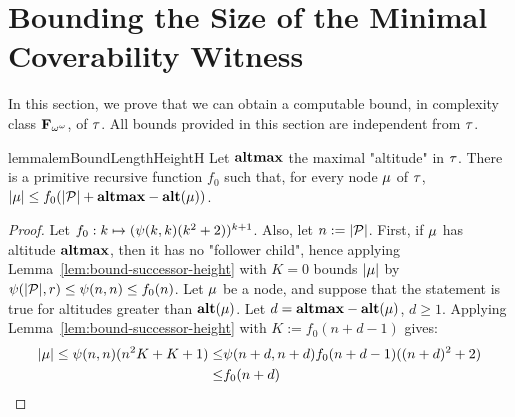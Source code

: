 \section{Bounding the Size of the Minimal Coverability Witness}
\label{app:proofs_bounds}

In this section, we prove that we can obtain a computable bound, in complexity class $\mathbf{F}_{\omega^{\omega}}$, of $\tau$. All bounds provided in this section are independent from $\tau$. 

\begin{restatable}{lemma}{lemBoundLengthHeightH}
	\label{lem:bound-length-at-height-h}
	Let $\mathbf{altmax}$ the maximal "altitude" in $\tau$. There is a primitive recursive function $f_0$ such that, for every node $\mu$ of $\tau$, $|\mu| \leq f_0(|\mathcal{P}| + \mathbf{altmax} - \mathbf{alt}(\mu))$.
\end{restatable}
\begin{proof}
Let $f_0: k \mapsto (\psi(k,k) (k^2 +2))^{k+1}$. Also, let $n := |\mathcal{P}|$.
First, if $\mu$ has altitude $\mathbf{altmax}$, then it has no "follower child", hence applying Lemma~\ref{lem:bound-successor-height} with $K=0$ bounds $|\mu|$ by $\psi(|\mathcal{P}|,r) \leq \psi(n,n) \leq f_0(n)$. Let $\mu$ be a node, and suppose that the statement is true for altitudes greater than $\mathbf{alt}(\mu)$. Let $d = \mathbf{altmax} - \mathbf{alt}(\mu)$, $d\geq 1$. Applying Lemma~\ref{lem:bound-successor-height} with $K := f_0(n + d - 1)$ gives: 
\begin{align*}
|\mu| \leq \psi(n,n) (n^2 K + K + 1) \leq & \psi(n+d,n+d) f_0(n+d-1) ((n+d)^2 +2)   \\ \leq & f_0(n+d) 
\end{align*}
\end{proof}

	
		
